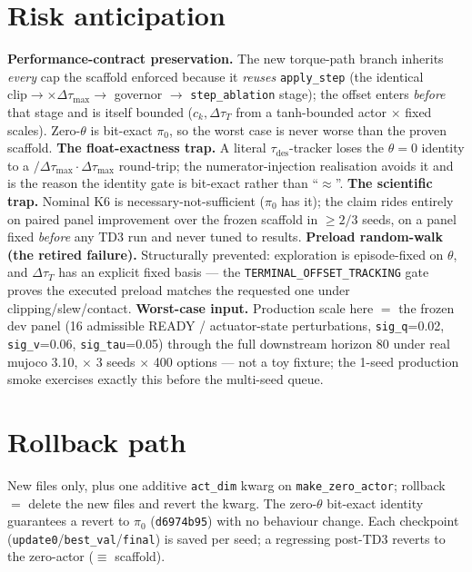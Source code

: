 \documentclass[11pt]{article}
\newcommand{\code}[1]{\texttt{\small #1}}
\newcommand{\slew}{\ensuremath{\Delta\tau_{\max}}}
\begin{document}
\section{Risk anticipation}
\textbf{Performance-contract preservation.} The new torque-path branch inherits \emph{every} cap the scaffold enforced
because it \emph{reuses} \code{apply\_step} (the identical $\mathrm{clip}\to\times\slew\to$ governor $\to$ \code{step\_ablation}
stage); the offset enters \emph{before} that stage and is itself bounded ($c_k,\Delta\tau_T$ from a tanh-bounded actor
$\times$ fixed scales). Zero-$\theta$ is bit-exact $\pi_0$, so the worst case is never worse than the proven scaffold.
\textbf{The float-exactness trap.} A literal $\tau_{\mathrm{des}}$-tracker loses the $\theta{=}0$ identity to a
$/\slew\!\cdot\!\slew$ round-trip; the numerator-injection realisation avoids it and is the reason the identity gate is
bit-exact rather than ``$\approx$''. \textbf{The scientific trap.} Nominal K6 is necessary-not-sufficient ($\pi_0$ has it);
the claim rides entirely on paired panel improvement over the frozen scaffold in $\ge2/3$ seeds, on a panel fixed
\emph{before} any TD3 run and never tuned to results. \textbf{Preload random-walk (the retired failure).} Structurally
prevented: exploration is episode-fixed on $\theta$, and $\Delta\tau_T$ has an explicit fixed basis --- the
\code{TERMINAL\_OFFSET\_TRACKING} gate proves the executed preload matches the requested one under clipping/slew/contact.
\textbf{Worst-case input.} Production scale here $=$ the frozen dev panel (16 admissible READY / actuator-state
perturbations, \code{sig\_q}=0.02, \code{sig\_v}=0.06, \code{sig\_tau}=0.05) through the full downstream horizon 80 under
real mujoco 3.10, $\times$ 3 seeds $\times$ 400 options --- not a toy fixture; the 1-seed production smoke exercises exactly
this before the multi-seed queue.

\section{Rollback path}
New files only, plus one additive \code{act\_dim} kwarg on \code{make\_zero\_actor}; rollback $=$ delete the new files and
revert the kwarg. The zero-$\theta$ bit-exact identity guarantees a revert to $\pi_0$ (\code{d6974b95}) with no behaviour
change. Each checkpoint (\code{update0}/\code{best\_val}/\code{final}) is saved per seed; a regressing post-TD3 reverts to
the zero-actor ($\equiv$ scaffold).
\end{document}
